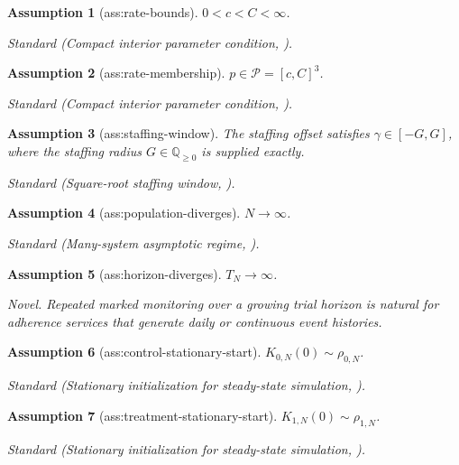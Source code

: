 \documentclass{article}
\newtheorem{assumption}{Assumption}
\begin{document}
\begin{assumption}[ass:rate-bounds]\label{ass:rate-bounds}
\(0<c<C<\infty\).
\par\smallskip\noindent\emph{Standard} (Compact interior parameter condition, \cite{NeweyMcFadden1994}).
\end{assumption}

\begin{assumption}[ass:rate-membership]\label{ass:rate-membership}
\(p\in\mathcal P=[c,C]^3\).
\par\smallskip\noindent\emph{Standard} (Compact interior parameter condition, \cite{NeweyMcFadden1994}).
\end{assumption}

\begin{assumption}[ass:staffing-window]\label{ass:staffing-window}
The staffing offset satisfies \(\gamma\in[-G,G]\), where the staffing radius \(G\in\mathbb Q_{\geq 0}\) is supplied exactly.
\par\smallskip\noindent\emph{Standard} (Square-root staffing window, \cite{BorstMandelbaumReiman2004}).
\end{assumption}

\begin{assumption}[ass:population-diverges]\label{ass:population-diverges}
\(N\to\infty\).
\par\smallskip\noindent\emph{Standard} (Many-system asymptotic regime, \cite{BravermanDai2017}).
\end{assumption}

\begin{assumption}[ass:horizon-diverges]\label{ass:horizon-diverges}
\(T_N\to\infty\).
\par\smallskip\noindent\emph{Novel.} Repeated marked monitoring over a growing trial horizon is natural for adherence services that generate daily or continuous event histories.
\end{assumption}

\begin{assumption}[ass:control-stationary-start]\label{ass:control-stationary-start}
\(K_{0,N}(0)\sim\rho_{0,N}\).
\par\smallskip\noindent\emph{Standard} (Stationary initialization for steady-state simulation, \cite{Whitt1992}).
\end{assumption}

\begin{assumption}[ass:treatment-stationary-start]\label{ass:treatment-stationary-start}
\(K_{1,N}(0)\sim\rho_{1,N}\).
\par\smallskip\noindent\emph{Standard} (Stationary initialization for steady-state simulation, \cite{Whitt1992}).
\end{assumption}
\end{document}
